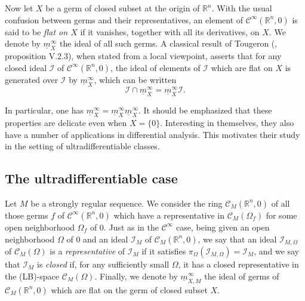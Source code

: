 \documentclass[a4paper]{amsart}
\theoremstyle{plain}
\theoremstyle{definition}
\theoremstyle{remark}
\newcommand{\imax}{\underline{m}}
\begin{document}
Now let $ X $ be a germ of closed subset at the origin of $ \mathbb{R}^n $. With the usual confusion between germs and their representatives, an element of $ \mathcal{C}^\infty(\mathbb{R}^n,0) $ is said to be \emph{flat on $ X $} if it vanishes, together with all its derivatives, on $ X $. We denote by $ \imax^\infty_X $ the ideal of all such germs. A classical result of Tougeron (\cite{Tougbook}, proposition V.2.3), when stated from a local viewpoint, asserts that
for any closed ideal $ \mathcal{I} $ of $ \mathcal{C}^\infty(\mathbb{R}^n,0) $, 
the ideal of elements of $ \mathcal{I} $ which
are flat on $ X $ is generated over $ \mathcal{I} $ by $ \imax^\infty_X$, which can be written 
\begin{equation}\label{eqtoug}
\mathcal{I}\cap \imax^\infty_X=\imax^\infty_X\mathcal{I}.
\end{equation}

In particular, one has $ \imax^\infty_X=\imax^\infty_X\imax^\infty_X $. It should be
emphasized that these properties are delicate even when $ X=\{0\} $.
Interesting in themselves, they also have a number of applications in differential analysis. This motivates their
study in the setting of ultradifferentiable classes. 

\subsection{The ultradifferentiable case}

Let $ M $ be a strongly regular sequence. We consider the ring
$ \mathcal{C}_M(\mathbb{R}^n,0) $ of all those germs $ f $ of
$ \mathcal{C}^\infty(\mathbb{R}^n,0) $ which have a representative in 
$ \mathcal{C}_M(\Omega_f) $ for some open neighborhood $ \Omega_f $ of
$ 0 $. Just as in the $ \mathcal{C}^\infty $ case, being given an open neighborhood $ \Omega $ of $ 0 $ and an
ideal $ \mathcal{I}_M $ of $ \mathcal{C}_M(\mathbb{R}^n,0) $, we say that an ideal $ \mathcal{I}_{M,\Omega} $ of $ \mathcal{C}_M(\Omega) $ is a \emph{representative} of $ \mathcal{I}_M $ if it satisfies $ \pi_\Omega(\mathcal{I}_{M,\Omega})=\mathcal{I}_M $, and we say that $ \mathcal{I}_M $ is \emph{closed} if, for any sufficiently small $ \Omega $, it has a closed representative in the 
(LB)-space $ \mathcal{C}_M(\Omega) $. Finally, we denote by $ \imax^\infty_{X,M} $ the ideal of germs of
$ \mathcal{C}_M(\mathbb{R}^n,0) $ which are flat on the germ of closed subset $ X $.
\end{document}

